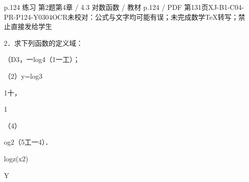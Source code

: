 \begin{bankitem}{p.124 练习 第2题}{第4章 / 4.3 对数函数 / 教材 p.124 / PDF 第131页}{XJ-B1-C04-PR-P124-Y0304}{OCR未校对：公式与文字均可能有误；未完成数学TeX转写；禁止直接发给学生}
\begin{ocrdraft}
\par
2．求下列函数的定义域：
\par
（D3，一log4（1一工）；
\par
（2）y=log3
\par
1十，
\par
1
\par
（4）
\par
og2（5工一4）．
\par
logz(x2)
\par
Y
\end{ocrdraft}
\end{bankitem}
